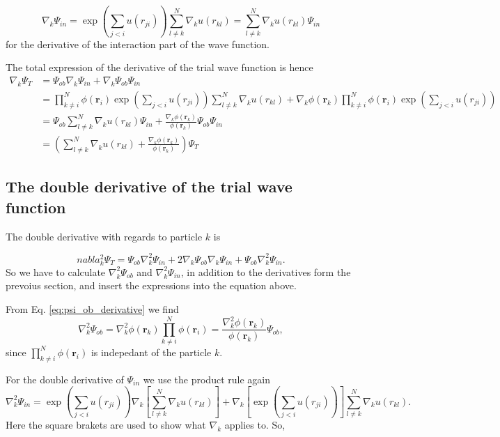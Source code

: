 \begin{equation}\label{eq:psi_in_derivative}
\nabla_k\Psi_{in} = \exp{\left(\sum_{j<i}u(r_{ji})\right)} \sum^N_{l \neq k} \nabla_k u (r_{kl}) = \sum^N_{l \neq k} \nabla_k u (r_{kl}) \Psi_{in}
\end{equation}
for the derivative of the interaction part of the wave function.

The total expression of the derivative of the trial wave function is hence 
\begin{align}
\nabla_k \Psi_T &= \Psi_{ob}\nabla_k\Psi_{in} + \nabla_k\Psi_{ob}\Psi_{in}\\
 &= \prod_{k\neq i}^N \phi(\mathbf{r}_i)\exp{\left(\sum_{j<i}u(r_{ji})\right)} \sum^N_{l \neq k} \nabla_k u (r_{kl}) + \nabla_k \phi(\mathbf{r}_k)\prod_{k\neq i}^N \phi(\mathbf{r}_i) \exp{\left(\sum_{j<i}u(r_{ji})\right)}\\
 &= \Psi_{ob}\sum^N_{l \neq k} \nabla_k u (r_{kl}) \Psi_{in}+ \frac{\nabla_k \phi(\mathbf{r}_k)}{\phi(\mathbf{r}_k)} \Psi_{ob}\Psi_{in}\\
 &= \left(\sum^N_{l \neq k} \nabla_k u (r_{kl})+ \frac{\nabla_k \phi(\mathbf{r}_k)}{\phi(\mathbf{r}_k)}\right) \Psi_T 
\end{align}

\subsection{The double derivative of the trial wave function}

The double derivative with regards to particle $k$ is

\begin{equation}\label{eq:total_double_start}
nabla^2_k \Psi_T =  \Psi_{ob}\nabla^2_k\Psi_{in} + 2\nabla_k\Psi_{ob}\nabla_k\Psi_{in} + \Psi_{ob}\nabla^2_k\Psi_{in}.
\end{equation}
So we have to calculate $\nabla^2_k\Psi_{ob}$ and $\nabla^2_k\Psi_{in}$, in addition to the derivatives form the prevoius section, and insert the expressions into the equation above.

From Eq. \ref{eq:psi_ob_derivative} we find
$$ \nabla^2_k\Psi_{ob} = \nabla^2_k \phi(\mathbf{r}_k)\prod_{k\neq i}^N \phi(\mathbf{r}_i) = \frac{\nabla^2_k \phi(\mathbf{r}_k)}{\phi(\mathbf{r}_k)} \Psi_{ob},$$
since $\prod_{k\neq i}^N \phi(\mathbf{r}_i)$ is indepedant of the particle $k$.

For the double derivative of $\Psi_{in}$ we use the product rule again
\begin{equation}\label{eq:double_derivative_start}
\nabla^2_k\Psi_{in} = \exp{\left(\sum_{j<i}u(r_{ji})\right)} \nabla_k\left[ \sum^N_{l \neq k} \nabla_k u (r_{kl})\right] +\nabla_k\left[ \exp{\left(\sum_{j<i}u(r_{ji})\right)}\right] \sum^N_{l \neq k} \nabla_k u (r_{kl}).
\end{equation}
Here the square brakets are used to show what $\nabla_k$ applies to. So,

